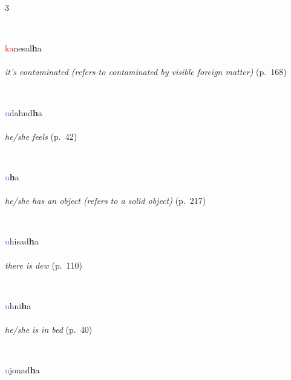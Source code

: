 \documentclass[oneside,openany]{book}%
\begin{document}
\begin{multicols}{3}
\begin{minipage}[t]{\linewidth}
\end{minipage}\\[1em]%
\begin{minipage}[t]{\linewidth}
\raggedright\noindent \textcolor{Red}{ka}nesal\textbf{h}a\\
\\
\noindent \textit{it's contaminated (refers to contaminated by visible foreign matter)} (p.~168)
\end{minipage}\\[1em]%
\begin{minipage}[t]{\linewidth}
\raggedright\noindent \textcolor{RoyalBlue}{u}dahnd\textbf{h}a\\
\\
\noindent \textit{he/she feels} (p.~42)
\end{minipage}\\[1em]%
\begin{minipage}[t]{\linewidth}
\raggedright\noindent \textcolor{RoyalBlue}{u}\textbf{h}a\\
\noindent {\small \textsf{\textcolor{RoyalBlue}{Set B}{-}\textbf{}{-}[stative-h]}}\\
\noindent \textit{he/she has an object (refers to a solid object)} (p.~217)
\end{minipage}\\[1em]%
\begin{minipage}[t]{\linewidth}
\raggedright\noindent \textcolor{RoyalBlue}{u}hisad\textbf{h}a\\
\\
\noindent \textit{there is dew} (p.~110)
\end{minipage}\\[1em]%
\begin{minipage}[t]{\linewidth}
\raggedright\noindent \textcolor{RoyalBlue}{u}hni\textbf{h}a\\
\\
\noindent \textit{he/she is in bed} (p.~40)
\end{minipage}\\[1em]%
\begin{minipage}[t]{\linewidth}
\raggedright\noindent \textcolor{RoyalBlue}{u}jonad\textbf{h}a\\

\end{minipage}
\end{multicols}
\end{document}
